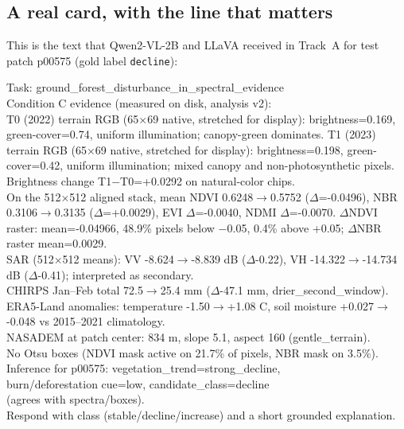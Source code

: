 \subsection{A real card, with the line that matters}

This is the text that Qwen2-VL-2B and LLaVA received in Track~A for test patch p00575 (gold label \texttt{decline}):

\begin{tcolorbox}[colback=gray!4,colframe=gray!50,fontupper=\scriptsize\ttfamily,breakable]
Task: ground\_forest\_disturbance\_in\_spectral\_evidence\\
Condition C evidence (measured on disk, analysis v2):\\
T0 (2022) terrain RGB (65$\times$69 native, stretched for display): brightness=0.169, green-cover=0.74, uniform illumination; canopy-green dominates. T1 (2023) terrain RGB (65$\times$69 native, stretched for display): brightness=0.198, green-cover=0.42, uniform illumination; mixed canopy and non-photosynthetic pixels. Brightness change T1$-$T0=+0.0292 on natural-color chips.\\
On the 512$\times$512 aligned stack, mean NDVI 0.6248$\rightarrow$0.5752 ($\Delta$=-0.0496), NBR 0.3106$\rightarrow$0.3135 ($\Delta$=+0.0029), EVI $\Delta$=-0.0040, NDMI $\Delta$=-0.0070. $\Delta$NDVI raster: mean=-0.04966, 48.9\% pixels below $-$0.05, 0.4\% above +0.05; $\Delta$NBR raster mean=0.0029.\\
SAR (512$\times$512 means): VV -8.624$\rightarrow$-8.839 dB ($\Delta$-0.22), VH -14.322$\rightarrow$-14.734 dB ($\Delta$-0.41); interpreted as secondary.\\
CHIRPS Jan--Feb total 72.5$\rightarrow$25.4 mm ($\Delta$-47.1 mm, drier\_second\_window). ERA5-Land anomalies: temperature -1.50$\rightarrow$+1.08 \textdegree C, soil moisture +0.027$\rightarrow$-0.048 vs 2015--2021 climatology.\\
NASADEM at patch center: 834 m, slope 5.1\textdegree, aspect 160\textdegree{} (gentle\_terrain).\\
No Otsu boxes (NDVI mask active on 21.7\% of pixels, NBR mask on 3.5\%).\\
\colorbox{red!20}{Inference for p00575: vegetation\_trend=strong\_decline,}\\
\colorbox{red!20}{burn/deforestation cue=low, candidate\_class=decline}\\
\colorbox{red!20}{(agrees with spectra/boxes).}\\
Respond with class (stable/decline/increase) and a short grounded explanation.
\end{tcolorbox}

